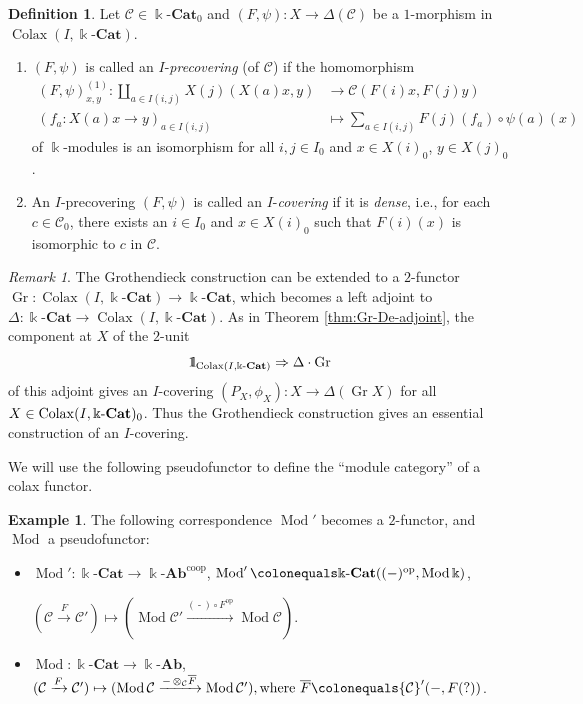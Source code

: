 \documentclass{surv-l}
\numberwithin{equation}{chapter}
\numberwithin{figure}{chapter}
\theoremstyle{plain}
\theoremstyle{definition}
\newtheorem{dfn}[thm]{Definition}
\newtheorem{exm}[thm]{Example}
\theoremstyle{remark}
\newtheorem{rmk}[thm]{Remark}
\newcommand{\id}{1\kern-.25em{\text{{\rm l}}}}
\newcommand{\kCat}{\Bbbk\text{-}\mathbf{Cat}}
\newcommand{\kAb}{\Bbbk\text{-}\mathbf{Ab}}
\DeclareMathOperator{\Mod}{Mod}
\DeclareMathOperator{\blank}{-}
\DeclareMathOperator{\Gr}{Gr}
\DeclareMathOperator{\Colax}{Colax}
\begin{document}
\begin{dfn}
Let ${\mathcal{C}} \in \kCat_0$ and $(F, \psi) \colon X \to \Delta({\mathcal{C}})$ be
a $1$-morphism in $\Colax(I, \kCat)$.
\begin{enumerate}
\item
$(F, \psi)$ is called an $I$-\emph{precovering} (of ${\mathcal{C}}$) if
the homomorphism
\begin{equation*}
\begin{aligned}
(F,\psi)_{x,y}^{(1)}\colon \coprod_{a\in I(i,j)}X(j)(X(a)x, y) &\to {\mathcal{C}}(F(i)x, F(j)y)\\
(f_a\colon X(a)x \to y)_{a\in I(i,j)} &\mapsto \sum_{a\in I(i,j)} F(j)(f_a) \circ\psi(a)(x)
\end{aligned}
\end{equation*}
of $\Bbbk$-modules is an isomorphism for all
$i, j \in I_0$ and $x \in X(i)_0$, $y \in X(j)_0$.
\item
An $I$-precovering $(F, \psi)$ is called an $I$-\emph{covering} if
it is \emph{dense}, i.e.,
for each $c \in {\mathcal{C}}_0$, there exists an $i \in I_0$ and $x \in X(i)_0$ such that
$F(i)(x)$ is isomorphic to $c$ in ${\mathcal{C}}$.
\end{enumerate}
\end{dfn}

\begin{rmk}
The Grothendieck construction can be extended to a $2$-functor
$\Gr \colon \Colax(I, \kCat) \to \kCat$, which becomes a left adjoint to
$\Delta \colon \kCat \to \Colax(I, \kCat)$.
As in Theorem \ref{thm:Gr-De-adjoint},
the component at $X$ of the $2$-unit
\[
\id_{\Colax(I, \kCat)} \Rightarrow \Delta \cdot \Gr
\]
of this adjoint
gives an $I$-covering $(P_X, \phi_X) \colon X \to \Delta(\Gr X)$
for all $X \in \Colax(I, \linebreak[3] \kCat)_0$.
Thus the Grothendieck construction gives an essential construction of an $I$-covering.
\end{rmk}

We will use the following pseudofunctor to define the ``module category''
of a colax functor.

\begin{exm}
The following correspondence $\Mod'$ becomes a $2$-functor, and $\Mod$
a pseudofunctor:
\begin{itemize}
\item
$\Mod' \colon \kCat \to \kAb^{\text{coop}}$,
$\Mod'\colonequals  \kCat((\blank)^{\mathrm{op}}, \Mod\Bbbk)$,

$({\mathcal{C}} \xrightarrow{F} {\mathcal{C}}') \mapsto (\Mod{\mathcal{C}}' \xrightarrow{(\blank)\circ F^{\mathrm{op}}} \Mod {\mathcal{C}})$.
\item
$\Mod \colon \kCat \to \kAb$,
$({\mathcal{C}} \xrightarrow{F} {\mathcal{C}}') \mapsto (\Mod{\mathcal{C}} \xrightarrow{\blank\otimes_{{\mathcal{C}}} \overline{F}} \Mod {\mathcal{C}}'),\\
\text{where }\overline{F}\colonequals {\mathcal{C}}'(\blank, F(?))$.
\end{itemize}
\end{exm}
\end{document}
